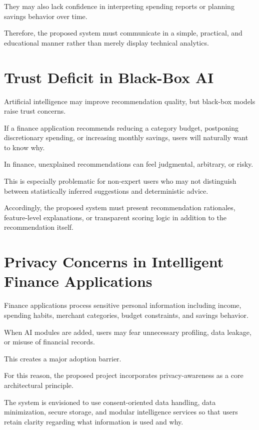 \documentclass[12pt,a4paper]{report}
\begin{document}
They may also lack confidence in interpreting spending reports or planning savings behavior over time.

Therefore,
the proposed system must communicate in a simple,
practical,
and educational manner rather than merely display technical analytics.

\section{Trust Deficit in Black-Box AI}
Artificial intelligence may improve recommendation quality,
but black-box models raise trust concerns.

If a finance application recommends reducing a category budget,
postponing discretionary spending,
or increasing monthly savings,
users will naturally want to know why.

In finance,
unexplained recommendations can feel judgmental,
arbitrary,
or risky.

This is especially problematic for non-expert users who may not distinguish between statistically inferred suggestions and deterministic advice.

Accordingly,
the proposed system must present recommendation rationales,
feature-level explanations,
or transparent scoring logic in addition to the recommendation itself.

\section{Privacy Concerns in Intelligent Finance Applications}
Finance applications process sensitive personal information including income,
spending habits,
merchant categories,
budget constraints,
and savings behavior.

When AI modules are added,
users may fear unnecessary profiling,
data leakage,
or misuse of financial records.

This creates a major adoption barrier.

For this reason,
the proposed project incorporates privacy-awareness as a core architectural principle.

The system is envisioned to use consent-oriented data handling,
data minimization,
secure storage,
and modular intelligence services so that users retain clarity regarding what information is used and why.
\end{document}
